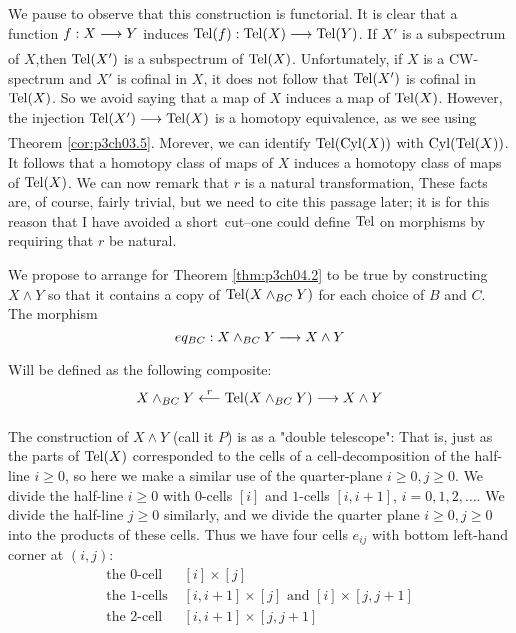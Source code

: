 \documentclass[../main]{subfiles}
\begin{document}
We pause to observe that this construction is functorial. It is clear
that a function $f:X\lar{}Y$ induces $\te{Tel}(f):\te{Tel}(X)\lar{}\te{Tel}(Y)$. If $X'$ is a subspectrum of $X$,then $\mathrm{Tel}(X')$ is a subspectrum of $\mathrm{Tel}(X)$. Unfortunately, if $X$ is a CW-spectrum and $X'$ is cofinal in $X$, it does not follow that $\mathrm{Tel}(X')$ is cofinal in $\mathrm{Tel}(X)$. So we avoid saying that a map of $X$ induces a map of $\mathrm{Tel}(X)$. However, the injection $\te{Tel}(X')\lar{} \te{Tel}(X) $ is a homotopy equivalence, as we see using Theorem \ref{cor:p3ch03.5}. Morever, we can identify $\mathrm{Tel}(\mathrm{Cyl}(X))$ with $\mathrm{Cyl}(\mathrm{Tel}(X))$. It follows that a homotopy class of maps of $X$ induces a homotopy class of
maps of $\mathrm{Tel}(X)$. We can now remark that $r$ is a natural transformation,
These facts are, of course, fairly trivial, but we need to cite this
passage later; it is for this reason that I have avoided a short~cut--one
could define $\mathrm{Tel}$ on morphisms by requiring that $r$ be natural. 

We propose to arrange for Theorem \ref{thm:p3ch04.2} to be true by constructing $X\wedge Y$ so that it contains a copy of $\mathrm{Tel}(X\wedge_{BC}Y)$ for each choice of $B$ and $C$. The morphism \[eq_{BC}:X\wedge_{BC}Y\lar{}X\wedge Y\]
Will be defined as the following composite:
\[X\wedge_{BC}Y\lal{r}\te{Tel}(X\wedge_{BC}Y)\lar{}X\wedge Y\]

The construction of $X\wedge Y$ (call it $P$) is as a "double telescope": That is, just as the parts of $\mathrm{Tel}(X)$ corresponded to the cells of a cell-decomposition of the half-line $i\geq 0$, so here we make a similar use of the quarter-plane $i\geq 0,j\geq 0$. We divide the half-line $i\geq 0$ with $0$-cells $[i]$ and $1$-cells $[i,i+1]$, $i=0,1,2,\dots$. We divide the half-line $j\geq 0$ similarly, and we divide the quarter plane $i\geq 0,j\geq 0$ into the products of these cells. Thus we have four cells $e_{ij}$ with bottom left-hand corner at $(i,j)$:
\begin{align*}
    \text{the 0-cell } & [i]\times [j]\\
    \text{the 1-cells }&[i,i+1]\times [j]\text{ and }[i]\times [j,j+1]\\
    \text{the 2-cell }&[i,i+1]\times [j,j+1] 
\end{align*}
\end{document}
